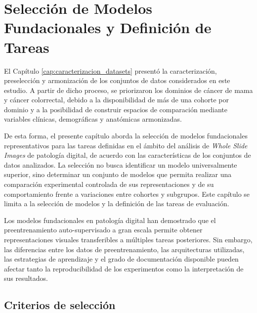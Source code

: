 \chapter{Selección de Modelos Fundacionales y Definición de Tareas}
\label{cap:seleccion_modelos}

El Capítulo \ref{cap:caracterizacion_datasets} presentó la caracterización, preselección y armonización de los conjuntos de datos considerados en este estudio. A partir de dicho proceso, se priorizaron los dominios de cáncer de mama y cáncer colorrectal, debido a la disponibilidad de más de una cohorte por dominio y a la posibilidad de construir espacios de comparación mediante variables clínicas, demográficas y anatómicas armonizadas.

De esta forma, el presente capítulo aborda la selección de modelos fundacionales representativos para las tareas definidas en el ámbito del análisis de \textit{Whole Slide Images} de patología digital, de acuerdo con las características de los conjuntos de datos analizados. La selección no busca identificar un modelo universalmente superior, sino determinar un conjunto de modelos que permita realizar una comparación experimental controlada de sus representaciones y de su comportamiento frente a variaciones entre cohortes y subgrupos. Este capítulo se limita a la selección de modelos y la definición de las tareas de evaluación.

Los modelos fundacionales en patología digital han demostrado que el preentrenamiento auto-supervisado a gran escala permite obtener representaciones visuales transferibles a múltiples tareas posteriores. Sin embargo, las diferencias entre los datos de preentrenamiento, las arquitecturas utilizadas, las estrategias de aprendizaje y el grado de documentación disponible pueden afectar tanto la reproducibilidad de los experimentos como la interpretación de sus resultados.

\section{Criterios de selección}
\label{sec:criterios_seleccion}

